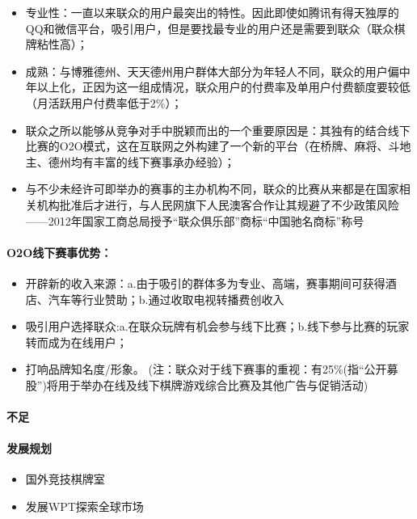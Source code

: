\documentclass[11pt]{article}
\providecommand{\tightlist}{%
      \setlength{\itemsep}{0pt}\setlength{\parskip}{0pt}}
\begin{document}
\begin{itemize}
\tightlist
\item
  专业性：一直以来联众的用户最突出的特性。因此即使如腾讯有得天独厚的QQ和微信平台，吸引用户，但是要找最专业的用户还是需要到联众（联众棋牌粘性高）；
\item
  成熟：与博雅德州、天天德州用户群体大部分为年轻人不同，联众的用户偏中年以上化，正因为这一组成情况，联众用户的付费率及单用户付费额度要较低（月活跃用户付费率低于2\%）；
\item
  联众之所以能够从竞争对手中脱颖而出的一个重要原因是：其独有的结合线下比赛的O2O模式，这在互联网之外构建了一个新的平台（在桥牌、麻将、斗地主、德州均有丰富的线下赛事承办经验）；
\item
  与不少未经许可即举办的赛事的主办机构不同，联众的比赛从来都是在国家相关机构批准后才进行，与人民网旗下人民澳客合作让其规避了不少政策风险------2012年国家工商总局授予``联众俱乐部''商标``中国驰名商标''称号
\end{itemize}

\hypertarget{o2oux7ebfux4e0bux8d5bux4e8bux4f18ux52bf}{%
\paragraph{O2O线下赛事优势：}\label{o2oux7ebfux4e0bux8d5bux4e8bux4f18ux52bf}}

\begin{itemize}
\tightlist
\item
  开辟新的收入来源：a.由于吸引的群体多为专业、高端，赛事期间可获得酒店、汽车等行业赞助；b.通过收取电视转播费创收入
\item
  吸引用户选择联众:a.在联众玩牌有机会参与线下比赛；b.线下参与比赛的玩家转而成为在线用户；
\item
  打响品牌知名度/形象。
  (注：联众对于线下赛事的重视：有25\%(指``公开募股'')将用于举办在线及线下棋牌游戏综合比赛及其他广告与促销活动)
\end{itemize}

\hypertarget{ux4e0dux8db3}{%
\paragraph{不足}\label{ux4e0dux8db3}}

\hypertarget{ux53d1ux5c55ux89c4ux5212}{%
\paragraph{发展规划}\label{ux53d1ux5c55ux89c4ux5212}}

\begin{itemize}
\tightlist
\item
  国外竞技棋牌室
\item
  发展WPT探索全球市场
\end{itemize}
\end{document}
